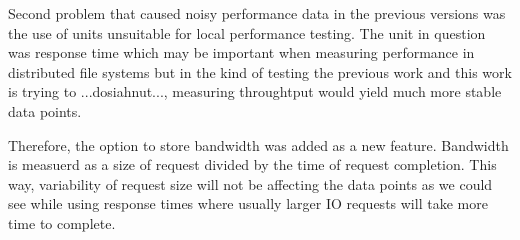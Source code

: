 \documentclass[
  color, %
  table, %
  lof,   %
  lot,   %
]{fithesis3}
\begin{document}
Second problem that caused noisy performance data in the previous versions was the use of units unsuitable for local performance testing. The unit in question was response time which may be important when measuring performance in distributed file systems but in the kind of testing the previous work and this work is trying to ...dosiahnut..., measuring throughtput would yield much more stable data points.

Therefore, the option to store bandwidth was added as a new feature. Bandwidth is measuerd as a size of request divided by the time of request completion. This way, variability of request size will not be affecting the data points as we could see while using response times where usually larger IO requests will take more time to complete.
\end{document}

